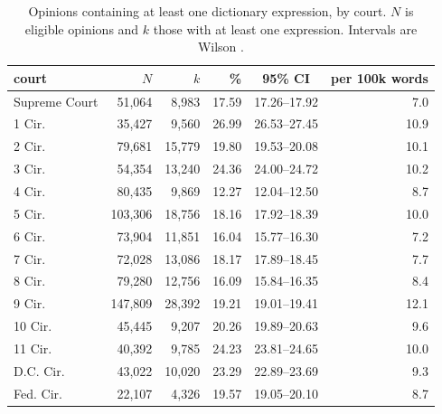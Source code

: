 \begin{table}[t]
\centering\footnotesize
\begin{tabular}{lrrrcr}
\toprule
court & $N$ & $k$ & \% & 95\% CI & per 100k words \\
\midrule
Supreme Court & 51,064 & 8,983 & 17.59 & 17.26--17.92 & 7.0 \\
1 Cir. & 35,427 & 9,560 & 26.99 & 26.53--27.45 & 10.9 \\
2 Cir. & 79,681 & 15,779 & 19.80 & 19.53--20.08 & 10.1 \\
3 Cir. & 54,354 & 13,240 & 24.36 & 24.00--24.72 & 10.2 \\
4 Cir. & 80,435 & 9,869 & 12.27 & 12.04--12.50 & 8.7 \\
5 Cir. & 103,306 & 18,756 & 18.16 & 17.92--18.39 & 10.0 \\
6 Cir. & 73,904 & 11,851 & 16.04 & 15.77--16.30 & 7.2 \\
7 Cir. & 72,028 & 13,086 & 18.17 & 17.89--18.45 & 7.7 \\
8 Cir. & 79,280 & 12,756 & 16.09 & 15.84--16.35 & 8.4 \\
9 Cir. & 147,809 & 28,392 & 19.21 & 19.01--19.41 & 12.1 \\
10 Cir. & 45,445 & 9,207 & 20.26 & 19.89--20.63 & 9.6 \\
11 Cir. & 40,392 & 9,785 & 24.23 & 23.81--24.65 & 10.0 \\
D.C. Cir. & 43,022 & 10,020 & 23.29 & 22.89--23.69 & 9.3 \\
Fed. Cir. & 22,107 & 4,326 & 19.57 & 19.05--20.10 & 8.7 \\
\bottomrule
\end{tabular}
\caption{Opinions containing at least one dictionary expression, by court. $N$ is eligible opinions and $k$ those with at least one expression. Intervals are Wilson \citep{wilson1927probable}.}
\label{tab:prevcourt}
\end{table}
